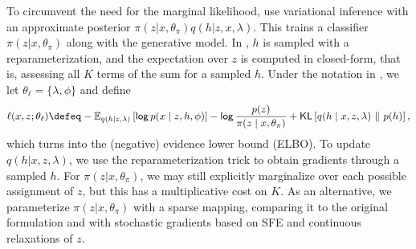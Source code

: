 To circumvent the need for the marginal likelihood,
\citet{KingmaEtAl2014SSVAE} use variational inference
\citep{Jordan+1999:VI} with an approximate posterior $\pi(z|x,
    \theta_\pi)q(h|z,x, \lambda)$. This trains a
classifier $\pi(z|x, \theta_\pi)$ along with the generative model. In
\citet{KingmaEtAl2014SSVAE}, $h$ is sampled with a
reparameterization, and the expectation over $z$ is computed in
closed-form, that is, assessing all $K$ terms of the sum for a
sampled $h$. Under the notation in ,
we let $\theta_\ell = \{\lambda, \phi\}$ and define
\begin{equation}
    \ell(x, z; \theta_\ell) \defeq
    - \mathbb E_{q(h|z,  \lambda)}\left[ \log p(x \mid z, h, \phi) \right] -
    \log \frac{p(z)}{\pi(z \mid x, \theta_\pi)} +
    \KL\left[q(h \mid x, z, \lambda) \,\,\|\,\, p(h)\right],
    \label{eq:elbonotation}
\end{equation}
which turns  into the (negative) evidence lower bound
(ELBO). To update $q(h | x, z, \lambda)$, we use the
reparameterization trick to obtain gradients through a sampled $h$.
For $\pi(z | x, \theta_\pi)$, we may still explicitly marginalize over
each possible assignment of $z$, but this has a multiplicative cost
on $K$. As an alternative, we parameterize $\pi(z|x,
    \theta_\pi)$ with a sparse mapping, comparing it to the original
formulation and with stochastic gradients based on SFE and continuous
relaxations of $z$.

